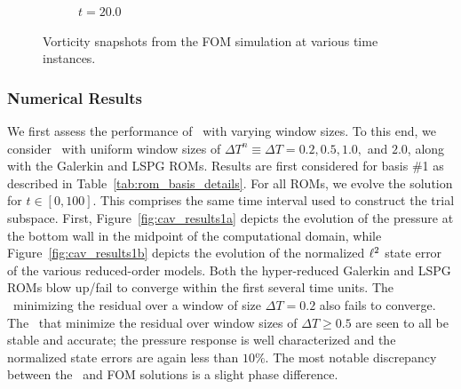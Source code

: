 \begin{figure}
\begin{center}
\begin{subfigure}[t]{0.49\textwidth}
\caption{$t=20.0$}
\end{subfigure}
\caption{Vorticity snapshots from the FOM simulation at various time instances.} 
\label{fig:fom_sols_cav}
\end{center}
\end{figure}


\subsubsection{Numerical Results}
We first assess the performance of \methodAcronymROMs\ with varying window sizes. To this end, we consider \methodAcronymROMs\ with uniform window 
sizes of $\Delta T^n \equiv \Delta T = 0.2,0.5,1.0,$ and $2.0$, along with the Galerkin and LSPG ROMs. Results are first considered for basis \#1 as described in 
Table~\ref{tab:rom_basis_details}. For all ROMs, we evolve 
the solution for $t \in [0,100]$. This comprises the same time interval used to construct the trial subspace. First, Figure~\ref{fig:cav_results1a} depicts the evolution of the pressure at the bottom wall in the midpoint of the computational domain, while Figure~\ref{fig:cav_results1b} depicts the evolution of the normalized $\ell^2$ state error of the various reduced-order models. Both the hyper-reduced Galerkin and LSPG ROMs blow up/fail to converge within the first several time units. The \methodAcronymROM\ minimizing the residual over a window of size $\Delta T = 0.2$ also fails to converge. The \methodAcronymROMs\ that minimize the residual over window sizes of $\Delta T \ge 0.5$ are seen to all be stable and accurate; the pressure response is well characterized and the normalized state errors are again less than $10\%$. The most notable discrepancy between the \methodAcronymROM\ and FOM solutions is a slight phase difference. 






